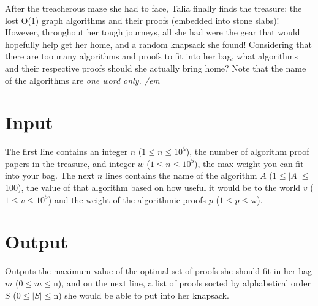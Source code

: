 
After the treacherous maze she had to face, Talia finally finds the treasure: the lost O(1) graph algorithms and their proofs (embedded into stone slabs)! However, throughout her tough journeys,
all she had were the gear that would hopefully help get her home, and a random knapsack she found! Considering that there are too many algorithms and proofs to fit 
into her bag, what algorithms and their respective proofs should she actually bring home? Note that the name of the algorithms are \em one word only. /em 


\section*{Input}
The first line contains an integer $n$ ($1 \le n \le 10^5$), the number of algorithm proof papers in the treasure, and integer $w$ ($1 \le n \le 10^5$), 
the max weight you can fit into your bag. The next $n$ lines contains the name of the algorithm $A$ ($1 \le |A| \le $100), 
the value of that algorithm based on how useful it would be to the world $v$ ($1 \le v \le 10^5$)
and the weight of the algorithmic proofs $p$ ($1 \le p \le $w).

\section*{Output}
Outputs the maximum value of the optimal set of proofs she should fit in her bag $m$ ($0 \le m \le $n), and on the next line, a list of proofs sorted by alphabetical order $S$ ($0 \le |S| \le $n) she would be able to put into her knapsack.
